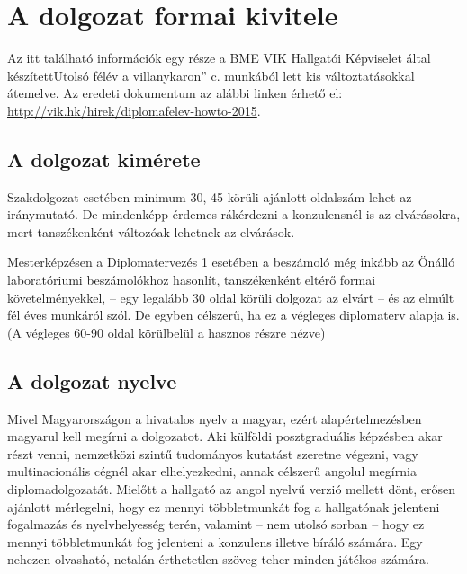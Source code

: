 \chapter{A dolgozat formai kivitele}
Az itt található információk egy része a BME VIK Hallgatói Képviselet által készítettUtolsó félév a villanykaron'' c. munkából lett kis változtatásokkal átemelve. Az eredeti dokumentum az alábbi linken érhető el: \url{http://vik.hk/hirek/diplomafelev-howto-2015}.

\section{A dolgozat kimérete}
Szakdolgozat esetében minimum 30, 45 körüli ajánlott oldalszám lehet az iránymutató. De mindenképp érdemes rákérdezni a konzulensnél is az elvárásokra, mert tanszékenként változóak lehetnek az elvárások.

Mesterképzésen a Diplomatervezés 1 esetében a beszámoló még inkább az Önálló laboratóriumi beszámolókhoz hasonlít, tanszékenként eltérő formai követelményekkel, -- egy legalább 30 oldal körüli dolgozat az elvárt -- és az elmúlt fél éves munkáról szól. De egyben célszerű, ha ez a végleges diplomaterv alapja is. (A végleges 60-90 oldal körülbelül a hasznos részre nézve)


\section{A dolgozat nyelve}
Mivel Magyarországon a hivatalos nyelv a magyar, ezért alapértelmezésben magyarul kell megírni a dolgozatot. Aki külföldi posztgraduális képzésben akar részt venni, nemzetközi szintű tudományos kutatást szeretne végezni, vagy multinacionális cégnél akar elhelyezkedni, annak célszerű angolul megírnia diplomadolgozatát. Mielőtt a hallgató az angol nyelvű verzió mellett dönt, erősen ajánlott mérlegelni, hogy ez mennyi többletmunkát fog a hallgatónak jelenteni fogalmazás és nyelvhelyesség terén, valamint -- nem utolsó sorban -- hogy ez mennyi többletmunkát fog jelenteni a konzulens illetve bíráló számára. Egy nehezen olvasható, netalán érthetetlen szöveg teher minden játékos számára.

